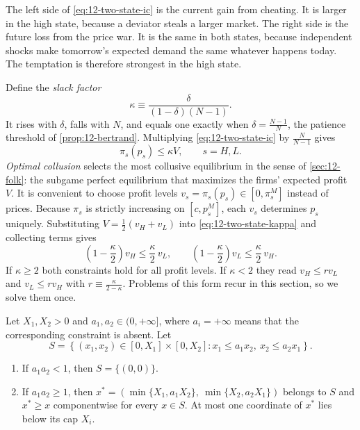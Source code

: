 The left side of \eqref{eq:12-two-state-ic} is the current gain from cheating. It is larger in the high state,
because a deviator steals a larger market. The right side is the future loss from the price war. It is the same in
both states, because independent shocks make tomorrow's expected demand the same whatever happens today. The
temptation is therefore strongest in the high state.

Define the \emph{slack factor}
\begin{equation}\label{eq:12-kappa}
\kappa \equiv \frac{\delta}{(1-\delta)(N-1)}.
\end{equation}
It rises with $\delta$, falls with $N$, and equals one exactly when $\delta = \frac{N-1}{N}$, the patience threshold of
\cref{prop:12-bertrand}. Multiplying \eqref{eq:12-two-state-ic} by $\frac{N}{N-1}$ gives
\begin{equation}\label{eq:12-two-state-kappa}
\pi_s(p_s) \le \kappa V, \qquad s = H, L.
\end{equation}
\emph{Optimal collusion} selects the most collusive equilibrium in the sense of \cref{sec:12-folk}: the subgame
perfect equilibrium that maximizes the firms' expected profit $V$. It is
convenient to choose profit levels $v_s = \pi_s(p_s) \in [0, \pi_s^M]$ instead of prices. Because $\pi_s$ is strictly
increasing on $[c, p_s^M]$, each $v_s$ determines $p_s$ uniquely. Substituting $V = \frac{1}{2}(v_H + v_L)$ into
\eqref{eq:12-two-state-kappa} and collecting terms gives
\begin{equation*}
\left(1 - \frac{\kappa}{2}\right) v_H \le \frac{\kappa}{2}\, v_L, \qquad \left(1 - \frac{\kappa}{2}\right) v_L \le \frac{\kappa}{2}\, v_H .
\end{equation*}
If $\kappa \ge 2$ both constraints hold for all profit levels. If $\kappa < 2$ they read $v_H \le r v_L$ and
$v_L \le r v_H$ with $r \equiv \frac{\kappa}{2 - \kappa}$. Problems of this form recur in this section, so we solve them once.

\begin{lemma}\label{lem:12-two-constraint}
Let $X_1, X_2 > 0$ and $a_1, a_2 \in (0, +\infty]$, where $a_i = +\infty$ means that the corresponding constraint is
absent. Let
\begin{equation*}
S = \left\{ (x_1, x_2) \in [0, X_1] \times [0, X_2] : x_1 \le a_1 x_2,\ x_2 \le a_2 x_1 \right\}.
\end{equation*}
\begin{enumerate}[label=(\roman*)]
\item If $a_1 a_2 < 1$, then $S = \{(0,0)\}$.
\item If $a_1 a_2 \ge 1$, then $x^* = \left(\min\{X_1, a_1 X_2\},\ \min\{X_2, a_2 X_1\}\right)$ belongs to $S$ and
$x^* \ge x$ componentwise for every $x \in S$. At most one coordinate of $x^*$ lies below its cap $X_i$.
\end{enumerate}
\end{lemma}

